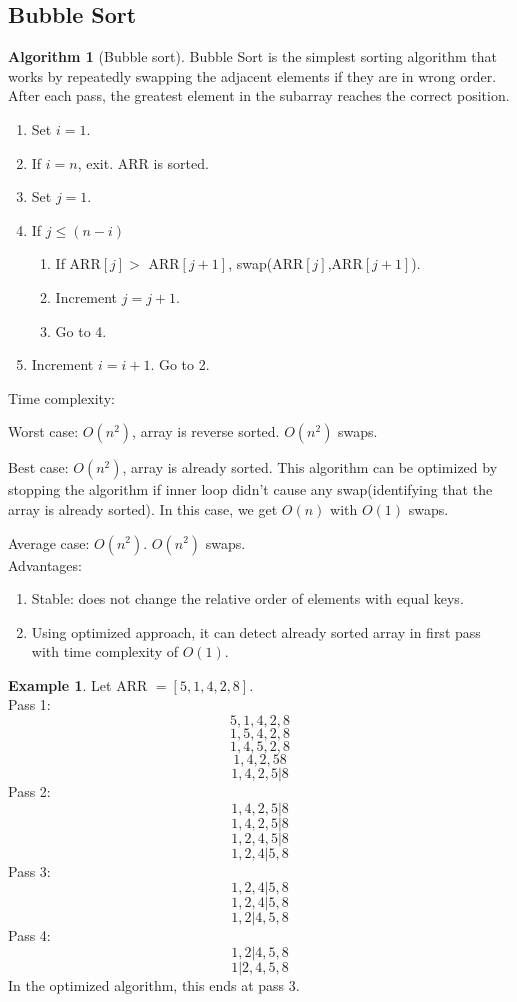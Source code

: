 \documentclass[10pt, a4paper]{extarticle}
\theoremstyle{definition}
\newtheorem{alg}{Algorithm}
\newtheorem{eg}{Example}
\begin{document}
	\subsection{Bubble Sort}
	\begin{alg}[Bubble sort]
		Bubble Sort is the simplest sorting algorithm that works by repeatedly swapping the adjacent elements if they are in wrong order. After each pass, the greatest element in the subarray reaches the correct position.
		\begin{enumerate}
			\item Set $i=1$.
			\item If $i= n$, exit. ARR is sorted.
			\item Set $j=1$.
			\item If $j\leq (n-i)$
				\begin{enumerate}
					\item If ARR$[j]>$ ARR$[j+1]$, swap(ARR$[j]$,ARR$[j+1]$).
					\item Increment $j=j+1$.
					\item Go to 4.
			\end{enumerate}
			\item Increment $i=i+1$. Go to 2.
	\end{enumerate}
		Time complexity:

		Worst case: $O(n^2)$, array is reverse sorted. $O(n^2)$ swaps.

		Best case: $O(n^2)$, array is already sorted. This algorithm can be optimized by stopping the algorithm if inner loop didn’t cause any swap(identifying that the array is already sorted). In this case, we get $O(n)$ with $O(1)$ swaps.

		Average case: $O(n^2)$. $O(n^2)$ swaps.
		\hfill\\
		Advantages:
		\begin{enumerate}
			\item Stable: does not change the relative order of elements with equal keys.
			\item Using optimized approach, it can detect already sorted array in first pass with time complexity of $O(1)$.
	\end{enumerate}

	\end{alg}
	\begin{eg}
		Let ARR $=[5,1,4,2,8]$.
		\hfill\\
		Pass 1:\[\boxed{5},1,4,2,8\]\[1,\boxed{5},4,2,8\]\[1,4,\boxed{5},2,8\]
		\[1,4,2,\boxed{5}8\]\[1,4,2,5|8\]
		Pass 2:\[\boxed{1},4,2,5|8\]\[1,\boxed{4},2,5|8\]\[1,2,\boxed{4},5|8\]
		\[1,2,4|5,8\]
		Pass 3:\[\boxed{1},2,4|5,8\]\[1,\boxed{2},4|5,8\]\[1,2|4,5,8\]
		Pass 4:\[\boxed{1},2|4,5,8\]\[1|2,4,5,8\]
		In the optimized algorithm, this ends at pass 3.
	\end{eg}
	
\end{document}
